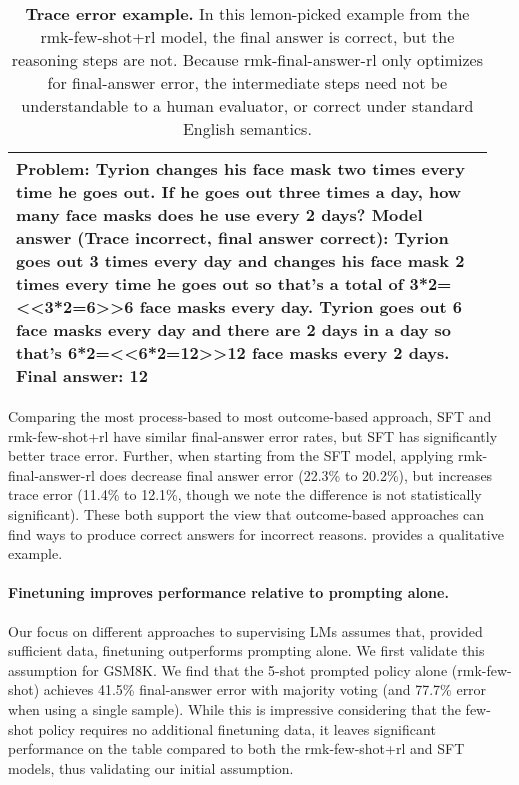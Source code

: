 \documentclass[11pt, a4paper, logo]{deepmind}
\newcommand{\Short}[1]{\csname rmk-#1\endcsname}
\newcommand{\fewshotANDrl}{\Short{few-shot+rl}}
\newcommand{\finalanswerrl}{\Short{final-answer-rl}}
\begin{document}
\begin{table}[t]
    \centering
    \begin{tabular}{p{0.95\linewidth}}
    \toprule
{\small \textbf{Problem}: Tyrion changes his face mask two times every time he goes out. If he goes out three times a day, how many face masks does he use every 2 days? \newline
\textbf{Model answer} (Trace incorrect, final answer correct): Tyrion goes out 3 times every day and changes his face mask 2 times every time he goes out so that's a total of 3*2=<<3*2=6>>6 face masks every day. \newline
Tyrion goes out 6 face masks every day and there are 2 days in a day so that's 6*2=<<6*2=12>>12 face masks every 2 days. \newline
Final answer: 12
} \\
    \bottomrule
    \end{tabular}
    \caption{\textbf{Trace error example.} 
    In this lemon-picked example from the \fewshotANDrl{} model, the final answer is correct, but the reasoning steps are not.
    Because \finalanswerrl{} only optimizes for final-answer error, the intermediate steps need not be understandable to a human evaluator, or correct under standard English semantics.
    \label{tab:trace_error_example}
    }
    \label{fig:trace_error_example}
\end{table}


 

Comparing the most process-based to most outcome-based approach, SFT and \Short{few-shot+rl} have similar final-answer error rates, but SFT has significantly better trace error.
Further, when starting from the SFT model, applying \finalanswerrl{} does decrease final answer error (22.3\% to 20.2\%), but increases trace error (11.4\% to 12.1\%, though we note the difference is not statistically significant).
These both support the view that outcome-based approaches can find ways to produce correct answers for incorrect reasons. 
 provides a qualitative example.


\paragraph{Finetuning improves performance relative to prompting alone.}
Our focus on different approaches to supervising LMs assumes that, provided sufficient data, finetuning outperforms prompting alone.
We first validate this assumption for GSM8K.  We find that the 5-shot prompted policy alone (\Short{few-shot}) achieves 41.5\% final-answer error with  majority voting (and 77.7\% error when using a single sample).  While this is impressive considering that the few-shot policy requires no additional finetuning data, it leaves significant performance on the table compared to both the \Short{few-shot+rl} and SFT models, thus validating our initial assumption.
\end{document}

